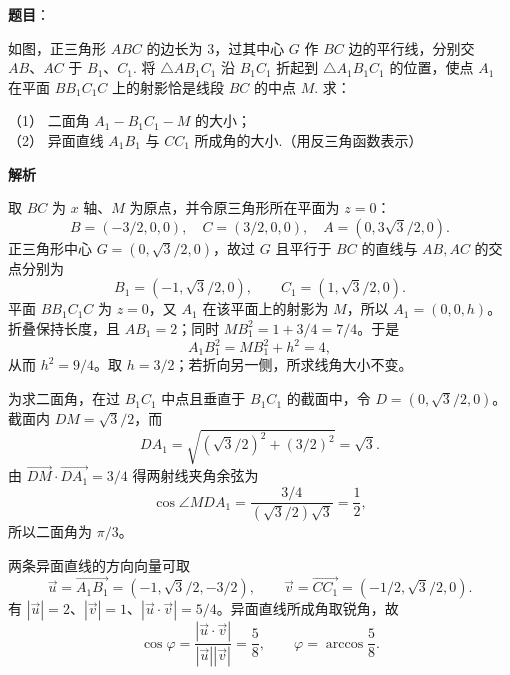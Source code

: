 \begin{answer}

\textbf{题目}：

如图，正三角形 $ABC$ 的边长为 $3$，过其中心 $G$ 作 $BC$ 边的平行线，分别交 $AB\text{、}AC$ 于 $B_1\text{、}C_1$. 将 $\triangle AB_1C_1$ 沿 $B_1C_1$ 折起到 $\triangle A_1B_1C_1$ 的位置，使点 $A_1$ 在平面 $BB_1C_1C$ 上的射影恰是线段 $BC$ 的中点 $M$. 求：

（1） 二面角 $A_1-B_1C_1-M$ 的大小；\\
（2） 异面直线 $A_1B_1$ 与 $CC_1$ 所成角的大小.（用反三角函数表示）
\nopagebreak[4]
\begin{center}\end{center}
\nopagebreak[4]
\textbf{解析}


取 $BC$ 为 $x$ 轴、$M$ 为原点，并令原三角形所在平面为 $z=0$：
\nopagebreak[4]
\[B=(-3/2,0,0),\quad C=(3/2,0,0),\quad A=(0,3\sqrt3/2,0).\]
正三角形中心 $G=(0,\sqrt3/2,0)$，故过 $G$ 且平行于 $BC$ 的直线与 $AB,AC$ 的交点分别为
\nopagebreak[4]
\[B_1=(-1,\sqrt3/2,0),\qquad C_1=(1,\sqrt3/2,0).\]
平面 $BB_1C_1C$ 为 $z=0$，又 $A_1$ 在该平面上的射影为 $M$，所以 $A_1=(0,0,h)$。折叠保持长度，且 $AB_1=2$；同时 $MB_1^2=1+3/4=7/4$。于是
\nopagebreak[4]
\[A_1B_1^2=MB_1^2+h^2=4,\]
从而 $h^2=9/4$。取 $h=3/2$；若折向另一侧，所求线角大小不变。

为求二面角，在过 $B_1C_1$ 中点且垂直于 $B_1C_1$ 的截面中，令 $D=(0,\sqrt3/2,0)$。截面内 $DM=\sqrt3/2$，而
\nopagebreak[4]
\[DA_1=\sqrt{(\sqrt3/2)^2+(3/2)^2}=\sqrt3.\]
由 $\overrightarrow{DM}\cdot\overrightarrow{DA_1}=3/4$ 得两射线夹角余弦为
\nopagebreak[4]
\[\cos\angle MDA_1=\frac{3/4}{(\sqrt3/2)\sqrt3}=\frac12,\]
所以二面角为 $\pi/3$。


两条异面直线的方向向量可取
\nopagebreak[4]
\[\vec u=\overrightarrow{A_1B_1}=(-1,\sqrt3/2,-3/2),\qquad
\vec v=\overrightarrow{CC_1}=(-1/2,\sqrt3/2,0).\]
有 $|\vec u|=2$、$|\vec v|=1$、$|\vec u\cdot\vec v|=5/4$。异面直线所成角取锐角，故
\nopagebreak[4]
\[\cos\varphi=\frac{|\vec u\cdot\vec v|}{|\vec u||\vec v|}=\frac58,
\qquad \varphi=\arccos\frac58.\]



\end{answer}

